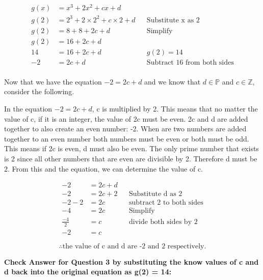 \documentclass[12pt]{book}
\begin{document}
\begin{enumerate}
\begin{align*}
    g(x) &= x^3 + 2x^2 + cx + d \\
    g(2) &= 2^3 + 2\times 2^2 + c\times 2 + d && \text{Substitute x as 2}\\
    g(2) &= 8 + 8 + 2c + d && \text{Simplify}\\
    g(2) &= 16 + 2c + d \\
    14 &= 16 + 2c + d && g(2) = 14\\
    -2 &= 2c + d && \text{Subtract 16 from both sides}\\
\end{align*}

\vspace{-1cm}

Now that we have the equation $-2 = 2c + d$ and we know that $d \in \mathbb{P}$ and $c \in \mathbb{Z}$, consider the following.

In the equation $-2 = 2c + d$, c is multiplied by 2. This means 
that no matter the value of c, if it is an integer, the value 
of 2c must be even. 2c and d are added together to also create 
an even number: -2. When are two numbers are added together to 
an even number both numbers must be even or both must be odd. 
This means if 2c is even, d must also be even. The only prime 
number that exists is 2 since all other numbers that are even 
are divisible by 2. Therefore d must be 2. From this and the 
equation, we can determine the value of c.

\vspace{-0.6cm}

\begin{align*}
    -2 &= 2c + d \\
    -2 &= 2c + 2 && \text{Substitute d as 2} \\
    -2 - 2 &= 2c && \text{subtract 2 to both sides}\\
    -4 &= 2c && \text{Simplify} \\
    \frac{-4}{2} &= c && \text{divide both sides by 2} \\
    -2 &= c
\end{align*}

$$\boxed{\therefore \text{the value of c and d are -2 and 2 respectively.}}$$

\newpage

\textbf{Check Answer for Question 3 by substituting the know values of c and d back into the original equation as g(2) = 14:}


\end{enumerate}
\end{document}
